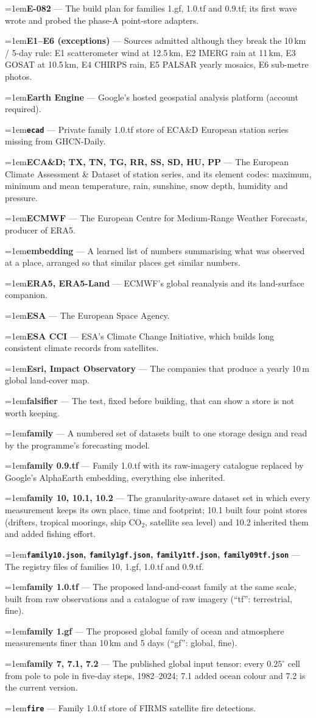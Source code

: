 \documentclass[10pt]{article}
\newcommand{\code}[1]{\texttt{#1}}
\newcommand{\gl}[2]{\par\hangindent=1em\hangafter=1\textbf{#1} --- #2\par}
\begin{document}
\gl{E-082}{The build plan for families 1.gf, 1.0.tf and 0.9.tf; its first wave wrote and probed the phase-A point-store adapters.}
\gl{E1--E6 (exceptions)}{Sources admitted although they break the 10\,km / 5-day rule: E1 scatterometer wind at 12.5\,km, E2 IMERG rain at 11\,km, E3 GOSAT at 10.5\,km, E4 CHIRPS rain, E5 PALSAR yearly mosaics, E6 sub-metre photos.}
\gl{Earth Engine}{Google's hosted geospatial analysis platform (account required).}
\gl{\code{ecad}}{Private family 1.0.tf store of ECA\&D European station series missing from GHCN-Daily.}
\gl{ECA\&D; TX, TN, TG, RR, SS, SD, HU, PP}{The European Climate Assessment \& Dataset of station series, and its element codes: maximum, minimum and mean temperature, rain, sunshine, snow depth, humidity and pressure.}
\gl{ECMWF}{The European Centre for Medium-Range Weather Forecasts, producer of ERA5.}
\gl{embedding}{A learned list of numbers summarising what was observed at a place, arranged so that similar places get similar numbers.}
\gl{ERA5, ERA5-Land}{ECMWF's global reanalysis and its land-surface companion.}
\gl{ESA}{The European Space Agency.}
\gl{ESA CCI}{ESA's Climate Change Initiative, which builds long consistent climate records from satellites.}
\gl{Esri, Impact Observatory}{The companies that produce a yearly 10\,m global land-cover map.}
\gl{falsifier}{The test, fixed before building, that can show a store is not worth keeping.}
\gl{family}{A numbered set of datasets built to one storage design and read by the programme's forecasting model.}
\gl{family 0.9.tf}{Family 1.0.tf with its raw-imagery catalogue replaced by Google's AlphaEarth embedding, everything else inherited.}
\gl{family 10, 10.1, 10.2}{The granularity-aware dataset set in which every measurement keeps its own place, time and footprint; 10.1 built four point stores (drifters, tropical moorings, ship CO$_2$, satellite sea level) and 10.2 inherited them and added fishing effort.}
\gl{\code{family10.json}, \code{family1gf.json}, \code{family1tf.json}, \code{family09tf.json}}{The registry files of families 10, 1.gf, 1.0.tf and 0.9.tf.}
\gl{family 1.0.tf}{The proposed land-and-coast family at the same scale, built from raw observations and a catalogue of raw imagery (``tf'': terrestrial, fine).}
\gl{family 1.gf}{The proposed global family of ocean and atmosphere measurements finer than 10\,km and 5 days (``gf'': global, fine).}
\gl{family 7, 7.1, 7.2}{The published global input tensor: every $0.25^\circ$ cell from pole to pole in five-day steps, 1982--2024; 7.1 added ocean colour and 7.2 is the current version.}
\gl{\code{fire}}{Family 1.0.tf store of FIRMS satellite fire detections.}
\end{document}
